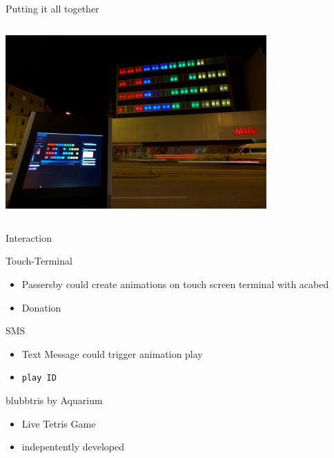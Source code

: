 \documentclass{beamer}
\begin{document}
\begin{frame}{Putting it all together}
  \begin{columns}
    \begin{column}{10cm}
      \includegraphics[width=10cm]{bilder/terminal.jpg}
    \end{column}
  \end{columns}
\end{frame}

\begin{frame}{Interaction}
    \begin{block}{Touch-Terminal}
	\begin{itemize}
	    \item Passersby could create animations on touch screen
		terminal with acabed
	    \item Donation
	\end{itemize}
    \end{block}

    \begin{block}{SMS}
	\begin{itemize}
	    \item Text Message could trigger animation play
	    \item \texttt{play ID}
	\end{itemize}
    \end{block}
    
    \begin{block}{blubbtris by Aquarium}
	\begin{itemize}
	    \item Live Tetris Game
	    \item indepentently developed
	\end{itemize}
    \end{block}
\end{frame}
\end{document}
